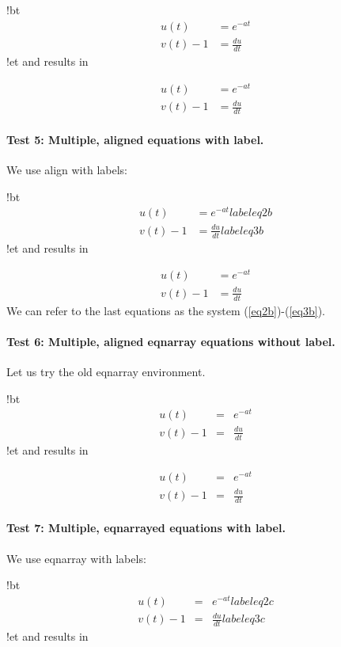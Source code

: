 \documentclass[%
oneside,                 %
final,                   %
10pt]{article}
\begin{document}
\bccq
!bt
\begin{align*}
u(t)&=e^{-at}\\ 
v(t) - 1 &= \frac{du}{dt}
\end{align*}
!et
\eccq
and results in

\begin{align*}
u(t)&=e^{-at}\\ 
v(t) - 1 &= \frac{du}{dt}
\end{align*}

\paragraph{Test 5: Multiple, aligned equations with label.}
We use align with
labels:

\bccq
!bt
\begin{align}
u(t)&=e^{-at}
label{eq2b}\\ 
v(t) - 1 &= \frac{du}{dt}
label{eq3b}
\end{align}
!et
\eccq
and results in

\begin{align}
u(t)&=e^{-at} \label{eq2b}\\ 
v(t) - 1 &= \frac{du}{dt} \label{eq3b}
\end{align}
We can refer to the last equations as the system (\ref{eq2b})-(\ref{eq3b}).




\paragraph{Test 6: Multiple, aligned eqnarray equations without label.}
Let us
try the old eqnarray environment.

\bccq
!bt
\begin{eqnarray*}
u(t)&=& e^{-at}\\ 
v(t) - 1 &=& \frac{du}{dt}
\end{eqnarray*}
!et
\eccq
and results in

\begin{eqnarray*}
u(t)&=& e^{-at}\\ 
v(t) - 1 &=& \frac{du}{dt}
\end{eqnarray*}

\paragraph{Test 7: Multiple, eqnarrayed equations with label.}
We use eqnarray with
labels:

\bccq
!bt
\begin{eqnarray}
u(t)&=& e^{-at}
label{eq2c}\\ 
v(t) - 1 &=& \frac{du}{dt}
label{eq3c}
\end{eqnarray}
!et
\eccq
and results in
\end{document}
